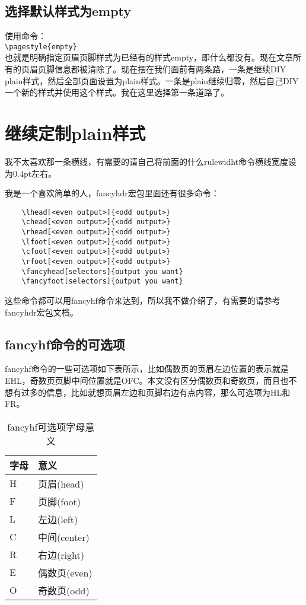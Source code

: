 \documentclass[11pt,oneside]{book}
\begin{document}
  \subsection{选择默认样式为empty}
  使用命令：\\
  \verb+\pagestyle{empty}+\\
  也就是明确指定页眉页脚样式为已经有的样式empty，即什么都没有。现在文章所有的页眉页脚信息都被清除了。现在摆在我们面前有两条路，一条是继续DIY plain样式，然后全部页面设置为plain样式。一条是plain继续归零，然后自己DIY一个新的样式并使用这个样式。我在这里选择第一条道路了。

  \section{继续定制plain样式}
  我不太喜欢那一条横线，有需要的请自己将前面的什么rulewidht命令横线宽度设为0.4pt左右。

  我是一个喜欢简单的人，fancyhdr宏包里面还有很多命令：
  \vspace{-20pt}
  \begin{Verbatim}
    \lhead[<even output>]{<odd output>}
    \chead[<even output>]{<odd output>}
    \rhead[<even output>]{<odd output>}
    \lfoot[<even output>]{<odd output>}
    \cfoot[<even output>]{<odd output>}
    \rfoot[<even output>]{<odd output>}
    \fancyhead[selectors]{output you want}
    \fancyfoot[selectors]{output you want}
  \end{Verbatim}
  这些命令都可以用fancyhf命令来达到，所以我不做介绍了，有需要的请参考fancyhdr宏包文档。

  \subsection{fancyhf命令的可选项}
  fancyhf命令的一些可选项如下表所示，比如偶数页的页眉左边位置的表示就是EHL，奇数页页脚中间位置就是OFC。本文没有区分偶数页和奇数页，而且也不想有过多的信息，比如就想页眉左边和页脚右边有点内容，那么可选项为HL和FR。
  \begin{table}[H]
    \centering
    \begin{tabular}{@{}ll@{}}
      \toprule
      字母 & 意义  \\ \midrule
      H  & 页眉(head)  \\
      F  & 页脚(foot)  \\
      L  & 左边(left)  \\
      C  & 中间(center)  \\
      R  & 右边(right)  \\
      E  & 偶数页(even) \\
      O  & 奇数页(odd) \\ \bottomrule
    \end{tabular}
    \label{tab:fancyhf可选项字母意义}
    \caption{fancyhf可选项字母意义}
  \end{table}
\end{document}
